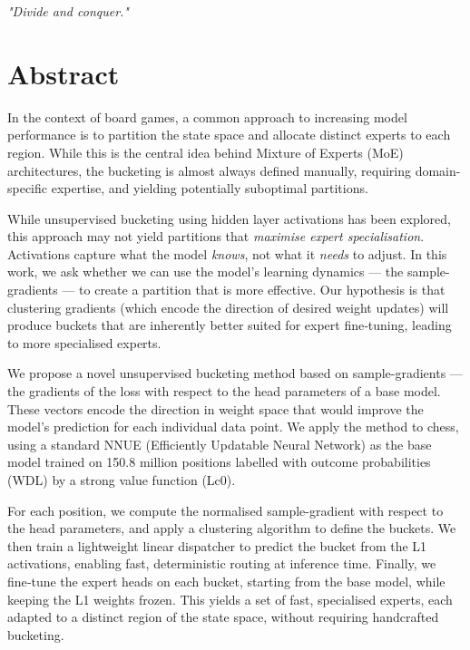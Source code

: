 



\emph{"Divide and conquer."}



\chapter*{Abstract}

In the context of board games, a common approach to increasing model performance is to partition the state space and allocate distinct experts to each region. While this is the central idea behind Mixture of Experts (MoE) architectures, the bucketing is almost always defined manually, requiring domain-specific expertise, and yielding potentially suboptimal partitions.

While unsupervised bucketing using hidden layer activations has been explored, this approach may not yield partitions that \emph{maximise expert specialisation}. Activations capture what the model \emph{knows}, not what it \emph{needs} to adjust. In this work, we ask whether we can use the model's learning dynamics --- the sample-gradients --- to create a partition that is more effective. Our hypothesis is that clustering gradients (which encode the direction of desired weight updates) will produce buckets that are inherently better suited for expert fine‑tuning, leading to more specialised experts.

We propose a novel unsupervised bucketing method based on sample-gradients --- the gradients of the loss with respect to the head parameters of a base model. These vectors encode the direction in weight space that would improve the model's prediction for each individual data point. We apply the method to chess, using a standard NNUE (Efficiently Updatable Neural Network) as the base model trained on 150.8 million positions labelled with outcome probabilities (WDL) by a strong value function (Lc0).

For each position, we compute the normalised sample-gradient with respect to the head parameters, and apply a clustering algorithm to define the buckets. We then train a lightweight linear dispatcher to predict the bucket from the L1 activations, enabling fast, deterministic routing at inference time. Finally, we fine‑tune the expert heads on each bucket, starting from the base model, while keeping the L1 weights frozen. This yields a set of fast, specialised experts, each adapted to a distinct region of the state space, without requiring handcrafted bucketing.






